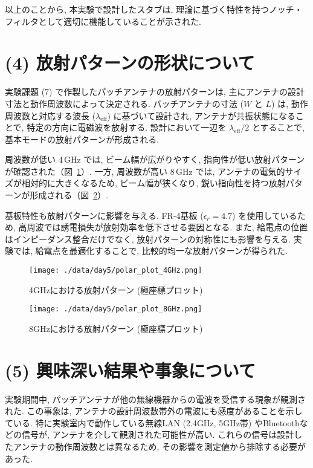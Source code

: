 \documentclass[a4paper, twocolumn]{article} %
\begin{document}
以上のことから, 本実験で設計したスタブは, 理論に基づく特性を持つノッチ・フィルタとして適切に機能していることが示された.



\section{(4) 放射パターンの形状について}
実験課題 (7) で作製したパッチアンテナの放射パターンは, 主にアンテナの設計寸法と動作周波数によって決定される. パッチアンテナの寸法 (\(W\) と \(L\)) は, 動作周波数と対応する波長 (\(\lambda_{\text{eff}}\)) に基づいて設計され, アンテナが共振状態になることで, 特定の方向に電磁波を放射する. 設計において一辺を \(\lambda_{\text{eff}}/2\) とすることで, 基本モードの放射パターンが形成される.

周波数が低い \(4 \, \text{GHz}\) では, ビーム幅が広がりやすく, 指向性が低い放射パターンが確認された（図~\ref{fig:polar_4GHz}）. 一方, 周波数が高い \(8 \, \text{GHz}\) では, アンテナの電気的サイズが相対的に大きくなるため, ビーム幅が狭くなり, 鋭い指向性を持つ放射パターンが形成される（図~\ref{fig:polar_8GHz}）.

基板特性も放射パターンに影響を与える. FR-4基板 (\(\epsilon_r = 4.7\)) を使用しているため, 高周波では誘電損失が放射効率を低下させる要因となる. また, 給電点の位置はインピーダンス整合だけでなく, 放射パターンの対称性にも影響を与える. 実験では, 給電点を最適化することで, 比較的均一な放射パターンが得られた.

\begin{figure}[h]
    \centering
    \texttt{[image: ./data/day5/polar\_plot\_4GHz.png]}
    \caption{4GHzにおける放射パターン (極座標プロット)}
    \label{fig:polar_4GHz}
\end{figure}

\begin{figure}[h]
    \centering
    \texttt{[image: ./data/day5/polar\_plot\_8GHz.png]}
    \caption{8GHzにおける放射パターン (極座標プロット)}
    \label{fig:polar_8GHz}
\end{figure}

\section{(5) 興味深い結果や事象について}
実験期間中, パッチアンテナが他の無線機器からの電波を受信する現象が観測された. この事象は, アンテナの設計周波数帯外の電波にも感度があることを示している. 特に実験室内で動作している無線LAN (2.4GHz, 5GHz帯) やBluetoothなどの信号が, アンテナを介して観測された可能性が高い. これらの信号は設計したアンテナの動作周波数とは異なるため, その影響を測定値から排除する必要があった.
\end{document}
